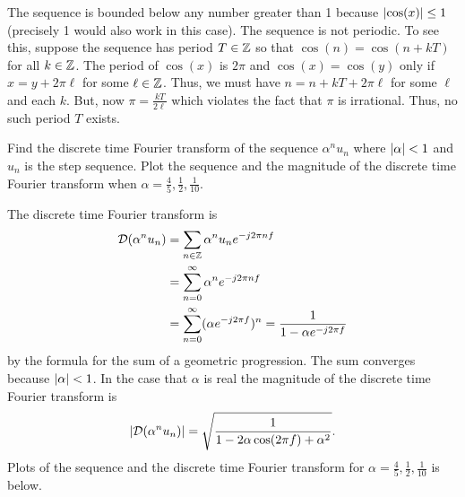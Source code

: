 \begin{excersizelist}
\begin{solution}
The sequence is bounded below any number greater than 1 because $\left\vert \cos(x) \right\vert \leq 1$ (precisely 1 would also work in this case).  The sequence is not periodic.  To see this, suppose the sequence has period $T \in {\mathbb Z}$ so that $\cos(n) = \cos(n + kT)$ for all $k \in {\mathbb Z}$.  The period of $\cos(x)$ is $2\pi$ and $\cos(x) = \cos(y)$ only if $x = y + 2\pi \ell$ for some $\ell \in {\mathbb Z}$.  Thus, we must have $n = n + kT + 2\pi \ell$ for some $\ell$ and each $k$.  But, now $\pi = \frac{kT}{2\ell}$ which violates the fact that $\pi$ is irrational.  Thus, no such period $T$ exists.

\end{solution}

\item Find the discrete time Fourier transform of the sequence $\alpha^n u_n$ where $\left\vert \alpha \right\vert < 1$ and $u_n$ is the step sequence.  Plot the sequence and the magnitude of the discrete time Fourier transform when $\alpha = \tfrac{4}{5}, \tfrac{1}{2}, \tfrac{1}{10}$.
\begin{solution}
The discrete time Fourier transform is
\begin{align*}
{\mathcal D}( \alpha^n u_n ) &= \sum_{n \in {\mathbb Z}} \alpha^n u_n e^{-j 2\pi n f} \\
&= \sum_{n = 0}^\infty \alpha^n e^{-j 2\pi n f} \\
&= \sum_{n = 0}^\infty (\alpha e^{-j 2\pi f})^n = \frac{1}{1 -  \alpha  e^{-j 2\pi f}}
\end{align*}
by the formula for the sum of a geometric progression.  The sum converges because $\left\vert \alpha \right\vert < 1$.  In the case that $\alpha$ is real the magnitude of the discrete time Fourier transform is
\[
\left\vert {\mathcal D}( \alpha^n u_n ) \right\vert = \sqrt{\frac{1}{1 - 2\alpha\cos(2\pi f) + \alpha^2}}.
\]
Plots of the sequence and the discrete time Fourier transform for $\alpha = \tfrac{4}{5}, \tfrac{1}{2}, \tfrac{1}{10}$ is below.


\end{solution}
\end{excersizelist}
